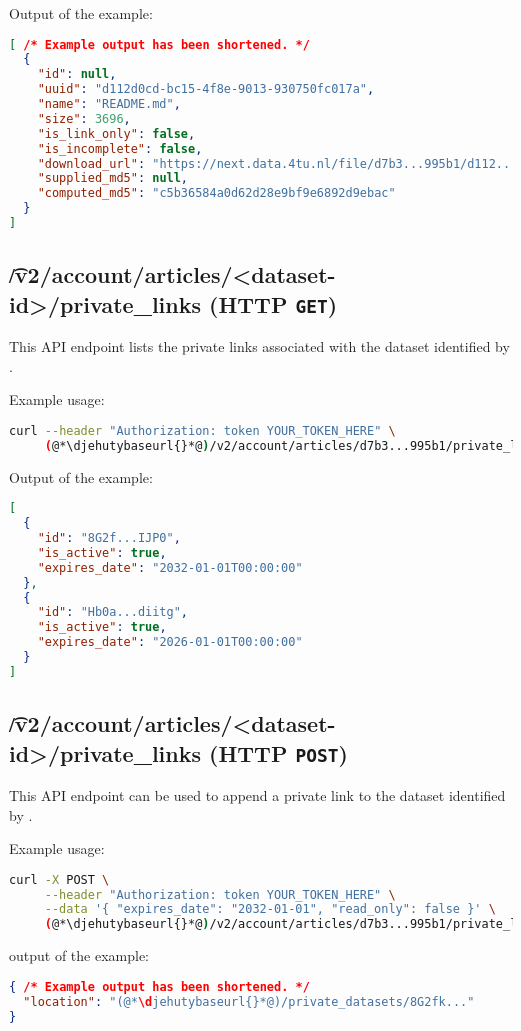   Output of the example:
\begin{lstlisting}[language=JSON]
[ /* Example output has been shortened. */
  {
    "id": null,
    "uuid": "d112d0cd-bc15-4f8e-9013-930750fc017a",
    "name": "README.md",
    "size": 3696,
    "is_link_only": false,
    "is_incomplete": false,
    "download_url": "https://next.data.4tu.nl/file/d7b3...995b1/d112...c017a",
    "supplied_md5": null,
    "computed_md5": "c5b36584a0d62d28e9bf9e6892d9ebac"
  }
]
\end{lstlisting}

\subsection{\t{/v2/account/articles/<dataset-id>/private\_links} (HTTP \texttt{GET})}

  This API endpoint lists the private links associated with the dataset
  identified by .

  Example usage:
\begin{lstlisting}[language=bash]
curl --header "Authorization: token YOUR_TOKEN_HERE" \
     (@*\djehutybaseurl{}*@)/v2/account/articles/d7b3...995b1/private_links | jq
\end{lstlisting}

  Output of the example:
\begin{lstlisting}[language=JSON]
[
  {
    "id": "8G2f...IJP0",
    "is_active": true,
    "expires_date": "2032-01-01T00:00:00"
  },
  {
    "id": "Hb0a...diitg",
    "is_active": true,
    "expires_date": "2026-01-01T00:00:00"
  }
]
\end{lstlisting}

\subsection{\t{/v2/account/articles/<dataset-id>/private\_links} (HTTP \texttt{POST})}

  This API endpoint can be used to append a private link to the dataset
  identified by \code{dataset-id}.

  Example usage:
\begin{lstlisting}[language=bash]
curl -X POST \
     --header "Authorization: token YOUR_TOKEN_HERE" \
     --data '{ "expires_date": "2032-01-01", "read_only": false }' \
     (@*\djehutybaseurl{}*@)/v2/account/articles/d7b3...995b1/private_links | jq
\end{lstlisting}

  output of the example:
\begin{lstlisting}[language=JSON]
{ /* Example output has been shortened. */
  "location": "(@*\djehutybaseurl{}*@)/private_datasets/8G2fk..."
}
\end{lstlisting}

